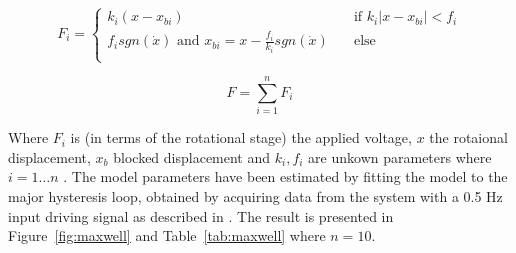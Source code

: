 \begin{equation}
  \label{eq:maxwell_slip}
  F_i =
  \begin{cases}
    k_i(x - x_{bi}) & \quad \text{if }  k_i|x - x_{bi}| < f_i\\
    f_isgn(\dot{x}) \text{ and } x_{bi} = x - \frac{f_i}{k_i}sgn(\dot{x})  & \quad \text{else}\\
  \end{cases}
\end{equation}

\begin{equation}
  \label{eq:maxwell_sum}
  F = \displaystyle\sum_{i=1}^{n} F_i
\end{equation}

Where $F_i$ is (in terms of the rotational stage) the applied voltage, $x$ the rotaional displacement, $x_b$ blocked displacement and $k_i, f_i$ are unkown parameters where $i=1 \hdots n$ . The model parameters have been estimated by fitting the model to the major hysteresis loop, obtained by acquiring data from the system with a 0.5 Hz input driving signal as described in \cite{ButcherIdentification:2015,ButcherController:2015}. The result is presented in Figure~\ref{fig:maxwell} and Table~\ref{tab:maxwell} where $n=10$.

